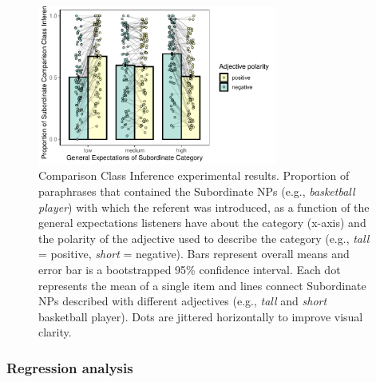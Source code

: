 \documentclass[doc, floatsintext]{apa6}
\newcommand{\red}[1]{\textcolor{Red}{#1}}
\newcommand{\mht}[1]{\textcolor{Blue}{[mht: #1]}}
\begin{document}
\begin{figure}[t]
\centering
\includegraphics[width=0.7\textwidth]{figs/bars_cc_finalExpt_prereg_bars_syncDodge.pdf}
\caption{Comparison Class Inference experimental results. Proportion of paraphrases that contained the Subordinate NPs (e.g., \emph{basketball player}) with which the referent was introduced, as a function of the general expectations listeners have about the category (x-axis) and the polarity of the adjective used to describe the category (e.g., \emph{tall} = positive, \emph{short} = negative). Bars represent overall means and error bar is a bootstrapped 95\% confidence interval. Each dot represents the mean of a single item and lines connect Subordinate NPs described with different adjectives (e.g., \emph{tall} and \emph{short} basketball player). Dots are jittered horizontally to improve visual clarity.}\label{fig:ccInferenceMain}
\end{figure}




\subsubsection{Regression analysis}
\end{document}
